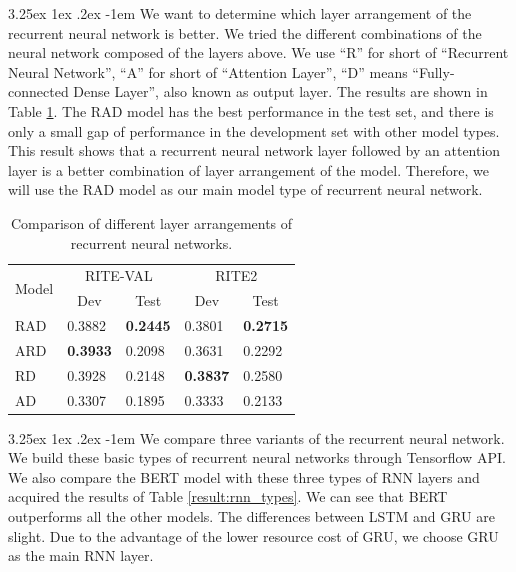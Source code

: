 \documentclass[12pt]{article}
\makeatletter
\renewcommand\paragraph{\@startsection{paragraph}{5}{\z@}%
  {3.25ex \@plus1ex \@minus.2ex}%
  {-1em}%
  {\normalfont\normalsize\bfseries}}
\makeatother
\begin{document}
\begin{CJK*}{UTF8}{bkai}
\begin{spacing}{1.77}
\paragraph{}
We want to determine which layer arrangement of the recurrent neural network is better. We tried the different combinations of the neural network composed of the layers above. We use ``R'' for short of ``Recurrent Neural Network'', ``A'' for short of ``Attention Layer'', ``D'' means ``Fully-connected Dense Layer'', also known as output layer. The results are shown in Table \ref{result:nn_types_comparison}. The RAD model has the best performance in the test set, and there is only a small gap of performance in the development set with other model types. This result shows that a recurrent neural network layer followed by an attention layer is a better combination of layer arrangement of the model. Therefore, we will use the RAD model as our main model type of recurrent neural network.

\begin{table}[H]
  \centering
  \setlength{\extrarowheight}{-3pt}
  \begin{tabular}{|l|l|l|l|l|}
  \hline
  \multicolumn{1}{|c|}{\multirow{2}{*}{Model}} & \multicolumn{2}{c|}{RITE-VAL} & \multicolumn{2}{c|}{RITE2} \\ \cline{2-5}
  \multicolumn{1}{|c|}{} & \multicolumn{1}{c|}{Dev} & \multicolumn{1}{c|}{Test} & \multicolumn{1}{c|}{Dev} & \multicolumn{1}{c|}{Test} \\ \hline
  RAD & 0.3882 & \textbf{0.2445} & 0.3801 & \textbf{0.2715} \\ \hline
  ARD & \textbf{0.3933} & 0.2098 & 0.3631 & 0.2292 \\ \hline
  RD & 0.3928 & 0.2148 & \textbf{0.3837} & 0.2580 \\ \hline
  AD & 0.3307 & 0.1895 & 0.3333 & 0.2133 \\ \hline
  \end{tabular}
  \caption{Comparison of different layer arrangements of recurrent neural networks.}
  \label{result:nn_types_comparison}
\end{table}

\paragraph{}
We compare three variants of the recurrent neural network. We build these basic types of recurrent neural networks through Tensorflow API. We also compare the BERT model with these three types of RNN layers and acquired the results of Table \ref{result:rnn_types}. We can see that BERT outperforms all the other models. The differences between LSTM and GRU are slight. Due to the advantage of the lower resource cost of GRU, we choose GRU as the main RNN layer.


\end{spacing}
\end{CJK*}
\end{document}

